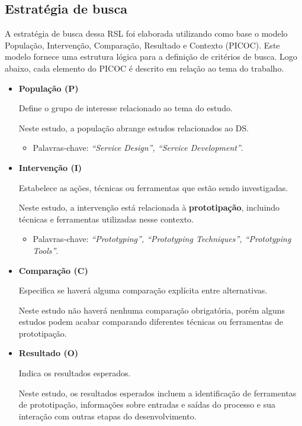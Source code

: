\subsection{Estratégia de busca}

A estratégia de busca dessa RSL foi elaborada utilizando como base o modelo População, Intervenção, Comparação, Resultado e Contexto (PICOC). Este modelo fornece uma estrutura lógica para a definição de critérios de busca. Logo abaixo, cada elemento do PICOC é descrito em relação ao tema do trabalho.

\begin{itemize}
	\item \textbf{População (P)}
	
	Define o grupo de interesse relacionado ao tema do estudo.
	
	Neste estudo, a população abrange estudos relacionados ao DS.
	\begin{itemize}
		\item Palavras-chave: \textit{``Service Design'', ``Service Development''}.
	\end{itemize}
	
	\item \textbf{Intervenção (I)}
	
	Estabelece as ações, técnicas ou ferramentas que estão sendo investigadas.
	
	Neste estudo, a intervenção está relacionada à \textbf{prototipação}, incluindo técnicas e ferramentas utilizadas nesse contexto.
	
	\begin{itemize}
		\item Palavras-chave: \textit{``Prototyping'', ``Prototyping Techniques'', ``Prototyping Tools''}.
	\end{itemize}
	
	\item \textbf{Comparação (C)}
	
	Especifica se haverá alguma comparação explícita entre alternativas.
	
	Neste estudo não haverá nenhuma comparação obrigatória, porém alguns estudos podem acabar comparando diferentes técnicas ou ferramentas de prototipação. 
	
	\item \textbf{Resultado (O)}
	
	Indica os resultados esperados.
	
	Neste estudo, os resultados esperados incluem a identificação de ferramentas de prototipação, informações sobre entradas e saídas do processo e sua interação com outras etapas do desenvolvimento.
	

\end{itemize}
